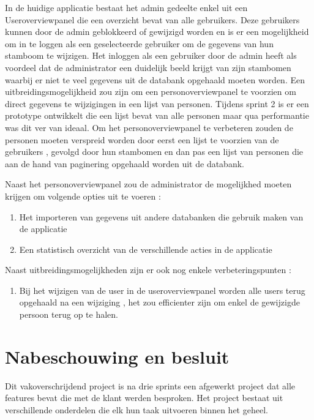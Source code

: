\documentclass[pdftex,a4paper,12pt,twoside]{report}
\begin{document}
In de huidige applicatie bestaat het admin gedeelte enkel uit een Useroverviewpanel die een overzicht bevat van alle gebruikers.
Deze gebruikers kunnen door de admin geblokkeerd of gewijzigd worden en is er een mogelijkheid om in te loggen als een geselecteerde gebruiker om de gegevens van hun stamboom te wijzigen.
Het inloggen als een gebruiker door de admin heeft als voordeel dat de administrator een duidelijk beeld krijgt van zijn stambomen waarbij er niet te veel gegevens uit de databank opgehaald moeten worden.
Een uitbreidingsmogelijkheid zou zijn om een personoverviewpanel te voorzien om direct gegevens te wijzigingen in een lijst van personen.
Tijdens sprint 2 is er een prototype ontwikkelt die een lijst bevat van alle personen maar qua performantie was dit ver van ideaal.
Om het personoverviewpanel te verbeteren zouden de personen moeten verspreid worden door eerst een lijst te voorzien van de gebruikers , gevolgd door hun stambomen en dan pas een lijst van personen die aan de hand van paginering opgehaald worden uit de databank. 

Naast het personoverviewpanel zou de administrator de mogelijkhed moeten krijgen om volgende opties uit te voeren :
\begin{enumerate}
\item \label{it:first} Het importeren van gegevens uit andere databanken die gebruik maken van de applicatie
\item \label{it:first} Een statistisch overzicht van de verschillende acties in de applicatie
\end{enumerate}









Naast uitbreidingsmogelijkheden zijn er ook nog enkele verbeteringspunten :

\begin{enumerate}
\item \label{it:first} Bij het wijzigen van de user in de useroverviewpanel worden alle users terug opgehaald na een wijziging , het zou efficienter zijn om enkel de gewijzigde persoon terug op te halen.
\end{enumerate}



\chapter{Nabeschouwing en besluit}
Dit vakoverschrijdend project is na drie sprints een afgewerkt project dat alle features bevat die met de klant werden besproken. Het project bestaat uit verschillende onderdelen die elk hun taak uitvoeren binnen het geheel.
\end{document}
